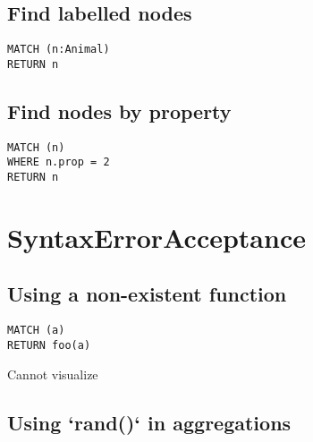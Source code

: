 \subsection{Find labelled nodes}

\begin{lstlisting}
MATCH (n:Animal)
RETURN n
\end{lstlisting}

\subsection{Find nodes by property}

\begin{lstlisting}
MATCH (n)
WHERE n.prop = 2
RETURN n
\end{lstlisting}

\section{SyntaxErrorAcceptance}

\subsection{Using a non-existent function}

\begin{lstlisting}
MATCH (a)
RETURN foo(a)
\end{lstlisting}

Cannot visualize
\subsection{Using `rand()` in aggregations}

